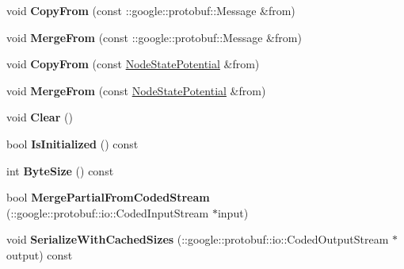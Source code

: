 \begin{DoxyCompactItemize}
\item 
\hypertarget{classgraph_1_1NodeStatePotential_ad843be9e9b83a35fa176832eb1bd5b85}{
void {\bfseries CopyFrom} (const ::google::protobuf::Message \&from)}
\label{classgraph_1_1NodeStatePotential_ad843be9e9b83a35fa176832eb1bd5b85}

\item 
\hypertarget{classgraph_1_1NodeStatePotential_a866262febdb1454339ec4c5df39a7638}{
void {\bfseries MergeFrom} (const ::google::protobuf::Message \&from)}
\label{classgraph_1_1NodeStatePotential_a866262febdb1454339ec4c5df39a7638}

\item 
\hypertarget{classgraph_1_1NodeStatePotential_ad9279ae8785df8040b597313593a8693}{
void {\bfseries CopyFrom} (const \hyperlink{classgraph_1_1NodeStatePotential}{NodeStatePotential} \&from)}
\label{classgraph_1_1NodeStatePotential_ad9279ae8785df8040b597313593a8693}

\item 
\hypertarget{classgraph_1_1NodeStatePotential_afed738d7eb798cfa66f0cd24ef51c19f}{
void {\bfseries MergeFrom} (const \hyperlink{classgraph_1_1NodeStatePotential}{NodeStatePotential} \&from)}
\label{classgraph_1_1NodeStatePotential_afed738d7eb798cfa66f0cd24ef51c19f}

\item 
\hypertarget{classgraph_1_1NodeStatePotential_a9f8b12b2fcf2faa5339aa1717a5fb285}{
void {\bfseries Clear} ()}
\label{classgraph_1_1NodeStatePotential_a9f8b12b2fcf2faa5339aa1717a5fb285}

\item 
\hypertarget{classgraph_1_1NodeStatePotential_a22b76e57f65c4389c74ffc73e25beff7}{
bool {\bfseries IsInitialized} () const }
\label{classgraph_1_1NodeStatePotential_a22b76e57f65c4389c74ffc73e25beff7}

\item 
\hypertarget{classgraph_1_1NodeStatePotential_a8a183bdcd7b8a4a0de3d52db9c25c4e9}{
int {\bfseries ByteSize} () const }
\label{classgraph_1_1NodeStatePotential_a8a183bdcd7b8a4a0de3d52db9c25c4e9}

\item 
\hypertarget{classgraph_1_1NodeStatePotential_a23e04477a52de0474588352745d87332}{
bool {\bfseries MergePartialFromCodedStream} (::google::protobuf::io::CodedInputStream $\ast$input)}
\label{classgraph_1_1NodeStatePotential_a23e04477a52de0474588352745d87332}

\item 
\hypertarget{classgraph_1_1NodeStatePotential_a31c56a9c6685e3ebfccf1b20d6126818}{
void {\bfseries SerializeWithCachedSizes} (::google::protobuf::io::CodedOutputStream $\ast$output) const }
\label{classgraph_1_1NodeStatePotential_a31c56a9c6685e3ebfccf1b20d6126818}


\end{DoxyCompactItemize}
